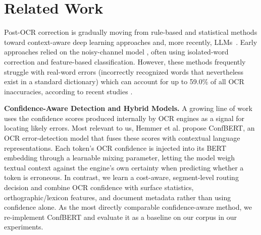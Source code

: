 \documentclass[sigconf]{acmart}
\begin{document}
\section{Related Work}
Post-OCR correction is gradually moving from rule-based and statistical methods toward context-aware deep learning approaches and, more recently, LLMs~\cite{nguyen2021survey}. Early approaches relied on the noisy-channel model \cite{kissos_ocr_2016}, often using isolated-word correction and feature-based classification. However, these methods frequently struggle with real-word errors (incorrectly recognized words that nevertheless exist in a standard dictionary) which can account for up to 59.0\% of all OCR inaccuracies, according to recent studies \cite{10.1007/978-3-031-70442-0_13}.

\medskip\noindent\textbf{Confidence-Aware Detection and Hybrid Models.}
A growing line of work uses the confidence scores produced internally by OCR engines as a signal for locating likely errors. Most relevant to us, Hemmer et al. \cite{10.1007/978-3-031-70442-0_13} propose ConfBERT, an OCR error-detection model that fuses these scores with contextual language representations. Each token's OCR confidence is injected into its BERT embedding through a learnable mixing parameter, letting the model weigh textual context against the engine's own certainty when predicting whether a token is erroneous. In contrast, we learn a cost-aware, segment-level routing decision and combine OCR confidence with surface statistics, orthographic/lexicon features, and document metadata rather than using confidence alone. As the most directly comparable confidence-aware method, we re-implement ConfBERT and evaluate it as a baseline on our corpus in our experiments.
\end{document}
